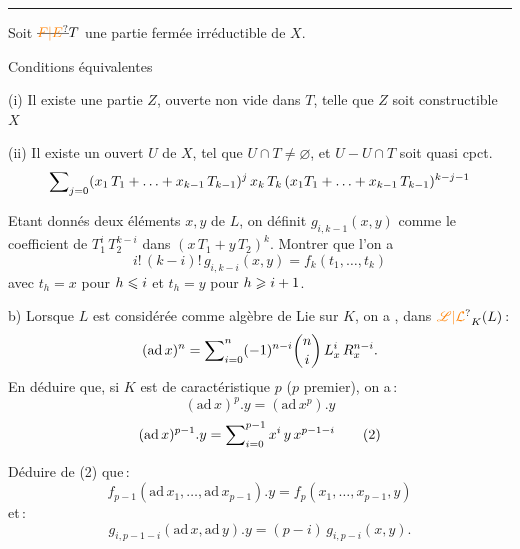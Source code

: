 \par\noindent\rule{.94\linewidth}{.3pt}

Soit $\deleted{\unsure{F|E}}T$ une partie fermée irréductible de $X$.

Conditions équivalentes

(i) Il existe une partie $Z$, ouverte non vide dans $T$, telle que $Z$ soit constructible  $X$

(ii) Il existe un ouvert  $U$ de $X$, tel que $U\cap T\ne\varnothing$, et $U-U\cap T$ soit quasi cpct.
\[
\mathop{\sum}\nolimits_{j=0}
(x_1\,T_1+\ldots+x_{k-1}\,T_{k-1})^j\,x_k\,T_k\,
(x_1 T_1+\ldots+x_{k-1}\,T_{k-1})^{k-j-1}
\]

Etant donnés deux éléments $x,y$ de $L$, on définit $g_{i,k-1}(x,y)$ comme le coefficient de $T_1^i\,T_2^{k-i}$ dans $(x\,T_1+y\,T_2)^k$. Montrer que l'on a
\[
i!\,(k-i)!\,g_{i,k-i}(x,y)=f_k(t_1,\ldots,t_k)
\]
avec $t_h=x$ pour $h\leqslant i$ et $t_h=y$ pour $h\geqslant i+1$.

b) Lorsque $L$ est considérée comme algèbre de Lie sur $K$, on a , dans $\handwritten{\unsure{\mathscr L|\mathcal L}}_K(L)$\,:
\[
(\mathrm{ad}\,x)^n=\mathop{\sum}\nolimits_{i=0}^{n}
(-1)^{n-i}\binom{n}{i}\,L_x^i\,R_x^{n-i}.
\]
En déduire que, si $K$ est de caractéristique $p$ ($p$ premier), on a\,:
\begingroup
\makeatletter
\tagsleft@true
\makeatother
\[
(\mathrm{ad}\,x)^p.y=(\mathrm{ad}\,x^p).y
\tag*{(1)}
\]
\[
(\mathrm{ad}\,x)^{p-1}.y=\mathop{\sum}\nolimits_{i=0}^{p-1}x^i\,y\,x^{p-1-i}
\tag*{(2)}
\]
\endgroup

Déduire de (2) que\,:
\[
f_{p-1}(\mathrm{ad}\,x_1,\ldots,\mathrm{ad}\,x_{p-1}).y=f_p(x_1,\ldots,x_{p-1},y)
\]
et\,:
\[
g_{i,p-1-i}(\mathrm{ad}\,x,\mathrm{ad}\,y).y=(p-i)\,g_{i,p-i}(x,y).
\]
